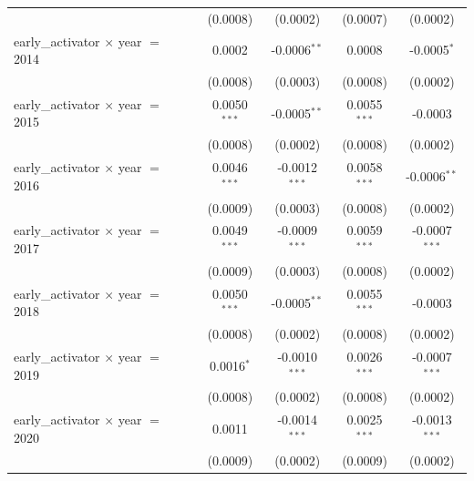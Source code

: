 \begin{tabular}{lcccc}
                                                   & (0.0008)           & (0.0002)                  & (0.0007)               & (0.0002)\\   
   early\_activator $\times$ year $=$ 2014         & 0.0002             & -0.0006$^{**}$            & 0.0008                 & -0.0005$^{*}$\\   
                                                   & (0.0008)           & (0.0003)                  & (0.0008)               & (0.0002)\\   
   early\_activator $\times$ year $=$ 2015         & 0.0050$^{***}$     & -0.0005$^{**}$            & 0.0055$^{***}$         & -0.0003\\   
                                                   & (0.0008)           & (0.0002)                  & (0.0008)               & (0.0002)\\   
   early\_activator $\times$ year $=$ 2016         & 0.0046$^{***}$     & -0.0012$^{***}$           & 0.0058$^{***}$         & -0.0006$^{**}$\\   
                                                   & (0.0009)           & (0.0003)                  & (0.0008)               & (0.0002)\\   
   early\_activator $\times$ year $=$ 2017         & 0.0049$^{***}$     & -0.0009$^{***}$           & 0.0059$^{***}$         & -0.0007$^{***}$\\   
                                                   & (0.0009)           & (0.0003)                  & (0.0008)               & (0.0002)\\   
   early\_activator $\times$ year $=$ 2018         & 0.0050$^{***}$     & -0.0005$^{**}$            & 0.0055$^{***}$         & -0.0003\\   
                                                   & (0.0008)           & (0.0002)                  & (0.0008)               & (0.0002)\\   
   early\_activator $\times$ year $=$ 2019         & 0.0016$^{*}$       & -0.0010$^{***}$           & 0.0026$^{***}$         & -0.0007$^{***}$\\   
                                                   & (0.0008)           & (0.0002)                  & (0.0008)               & (0.0002)\\   
   early\_activator $\times$ year $=$ 2020         & 0.0011             & -0.0014$^{***}$           & 0.0025$^{***}$         & -0.0013$^{***}$\\   
                                                   & (0.0009)           & (0.0002)                  & (0.0009)               & (0.0002)\\   

\end{tabular}
